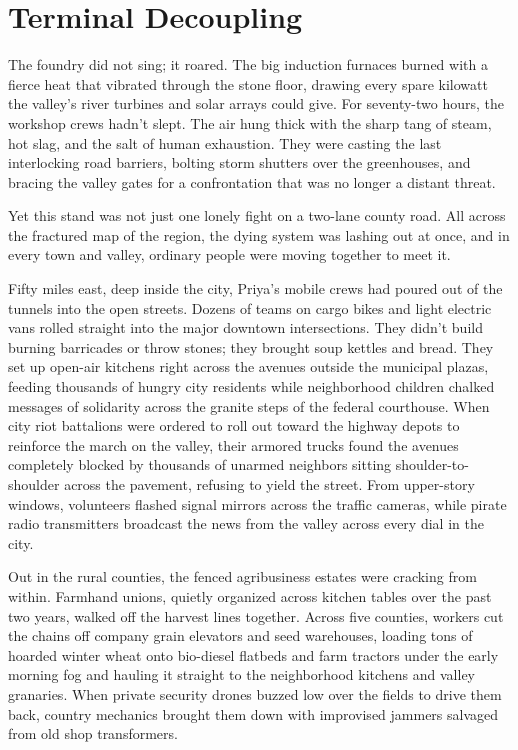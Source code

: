 \chapter{Terminal Decoupling}


The foundry did not sing; it roared. The big induction furnaces burned with a fierce heat that vibrated through the stone floor, drawing every spare kilowatt the valley’s river turbines and solar arrays could give. For seventy-two hours, the workshop crews hadn't slept. The air hung thick with the sharp tang of steam, hot slag, and the salt of human exhaustion. They were casting the last interlocking road barriers, bolting storm shutters over the greenhouses, and bracing the valley gates for a confrontation that was no longer a distant threat.

Yet this stand was not just one lonely fight on a two-lane county road. All across the fractured map of the region, the dying system was lashing out at once, and in every town and valley, ordinary people were moving together to meet it.

Fifty miles east, deep inside the city, Priya’s mobile crews had poured out of the tunnels into the open streets. Dozens of teams on cargo bikes and light electric vans rolled straight into the major downtown intersections. They didn't build burning barricades or throw stones; they brought soup kettles and bread. They set up open-air kitchens right across the avenues outside the municipal plazas, feeding thousands of hungry city residents while neighborhood children chalked messages of solidarity across the granite steps of the federal courthouse. When city riot battalions were ordered to roll out toward the highway depots to reinforce the march on the valley, their armored trucks found the avenues completely blocked by thousands of unarmed neighbors sitting shoulder-to-shoulder across the pavement, refusing to yield the street. From upper-story windows, volunteers flashed signal mirrors across the traffic cameras, while pirate radio transmitters broadcast the news from the valley across every dial in the city.

Out in the rural counties, the fenced agribusiness estates were cracking from within. Farmhand unions, quietly organized across kitchen tables over the past two years, walked off the harvest lines together. Across five counties, workers cut the chains off company grain elevators and seed warehouses, loading tons of hoarded winter wheat onto bio-diesel flatbeds and farm tractors under the early morning fog and hauling it straight to the neighborhood kitchens and valley granaries. When private security drones buzzed low over the fields to drive them back, country mechanics brought them down with improvised jammers salvaged from old shop transformers.

